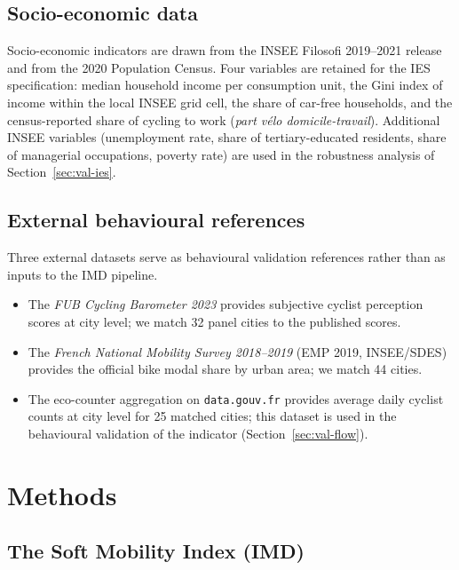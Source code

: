 \documentclass[11pt,a4paper]{article}
\begin{document}
\subsection{Socio-economic data}

Socio-economic indicators are drawn from the INSEE Filosofi
2019--2021 release and from the 2020 Population Census. Four
variables are retained for the IES specification: median household
income per consumption unit, the Gini index of income within the
local INSEE grid cell, the share of car-free households, and the
census-reported share of cycling to work (\emph{part vélo
domicile-travail}). Additional INSEE variables (unemployment rate,
share of tertiary-educated residents, share of managerial
occupations, poverty rate) are used in the robustness analysis of
Section~\ref{sec:val-ies}.

\subsection{External behavioural references}

Three external datasets serve as behavioural validation references
rather than as inputs to the IMD pipeline.

\begin{itemize}
\item The \emph{FUB Cycling Barometer 2023} provides subjective
cyclist perception scores at city level; we match 32 panel cities
to the published scores.
\item The \emph{French National Mobility Survey 2018--2019} (EMP
2019, INSEE/SDES) provides the official bike modal share by urban
area; we match 44 cities.
\item The eco-counter aggregation on \texttt{data.gouv.fr}
provides average daily cyclist counts at city level for 25
matched cities; this dataset is used in the behavioural validation
of the indicator (Section~\ref{sec:val-flow}).
\end{itemize}

\section{Methods}
\label{sec:methods}

\subsection{The Soft Mobility Index (IMD)}
\end{document}
